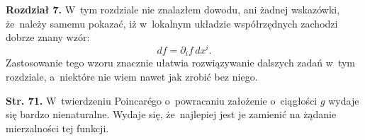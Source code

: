 \documentclass[a4paper,11pt]{article}
\begin{document}
\vspace{\spaceTwo}







\start \textbf{Rozdział 7.} W~tym rozdziale nie znalazłem dowodu, ani
żadnej wskazówki, że~należy samemu pokazać, iż w~lokalnym układzie
współrzędnych zachodzi dobrze znany wzór:
\begin{equation*}
  d f = \partial_{ i } f\, d x^{ i }.
\end{equation*}
Zastosowanie tego wzoru znacznie ułatwia rozwiązywanie dalszych zadań
w~tym rozdziale, a~niektóre nie wiem nawet jak zrobić bez niego.

\vspace{\spaceFour}


\start \textbf{Str. 71.} W~twierdzeniu Poincar\'{e}go o~powracaniu
założenie o~ciągłości $g$ wydaje się bardzo nienaturalne. Wydaje się,
że~najlepiej jest je zamienić na żądanie mierzalności tej funkcji.

\vspace{\spaceFour}
\end{document}
